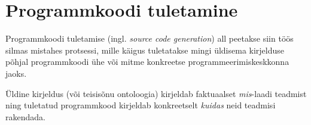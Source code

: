 \documentclass[12pt,a4paper]{article}
\begin{document}





%
%
%





\newpage
\section{Programmkoodi tuletamine}
\label{sec:programmkoodi-tuletamine}


Programmkoodi tuletamise (ingl. \textit{source code generation}) all peetakse siin töös silmas mistahes protsessi, mille käigus tuletatakse mingi üldisema kirjelduse põhjal programmkoodi ühe või mitme konkreetse programmeerimis\-keskkonna jaoks.

Üldine kirjeldus (või teisisõnu ontoloogia) kirjeldab faktuaalset \textit{mis}-laadi teadmist ning tuletatud programmkood kirjeldab konkreetselt \textit{kuidas} neid teadmisi rakendada.
\end{document}
